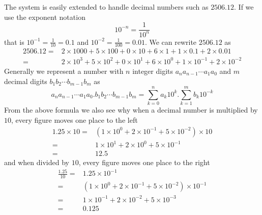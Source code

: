 The system is easily extended to handle decimal numbers such as $2506.12$. If we use the exponent notation
\[
10^{-n} = \frac{1}{10^{n}}
\]
that is $10^{-1} = \frac{1}{10} = 0.1$ and $10^{-2} = \frac{1}{100} = 0.01$. We can rewrite $2506.12$ as 
\begin{align*}
2506.12 =& 2 \times 1000 + 5 \times 100 + 0 \times 10 + 6 \times 1 + 1 \times 0.1 + 2 \times 0.01 \\
        =& 2 \times 10^{3} + 5 \times 10^{2} + 0 \times 10^{1} + 6 \times 10^{0} + 1 \times 10^{-1} + 2 \times 10^{-2} 
\end{align*}
Generally we represent a number with $n$ integer digits $a_{n}a_{n-1} \cdots a_{1}a_{0}$ and $m$ decimal digits 
$b_{1}b_{2} \cdots b_{m-1}b_{m}$ as 
\begin{equation}\label{arit:decimal-system}
a_{n}a_{n-1} \cdots a_{1}a_{0}.b_{1}b_{2} \cdots b_{m-1}b_{m} = \sum_{k=0}^{n} a_{k}10^{k}.\sum_{k=1}^{m} b_{k}10^{-k}
\end{equation}
From the above formula we also see why when a decimal number is multiplied by $10$, every figure moves one place to the left
\begin{align*}
1.25 \times 10 =& (1 \times 10^0 + 2 \times 10^{-1} + 5 \times 10^{-2}) \times 10 \\
               =& 1 \times 10^1 + 2 \times 10^0 + 5 \times 10^{-1} \\
               =& 12.5 
\end{align*}
and when divided by $10$, every figure moves one place to the right 
\begin{align*}
\frac{1.25}{10} =& 1.25 \times 10^{-1} \\
                =& (1 \times 10^0 + 2 \times 10^{-1} + 5 \times 10^{-2}) \times 10^{-1} \\
                =& 1 \times 10^{-1} + 2 \times 10^{-2} + 5 \times 10^{-3} \\
                =& 0.125 
\end{align*}

